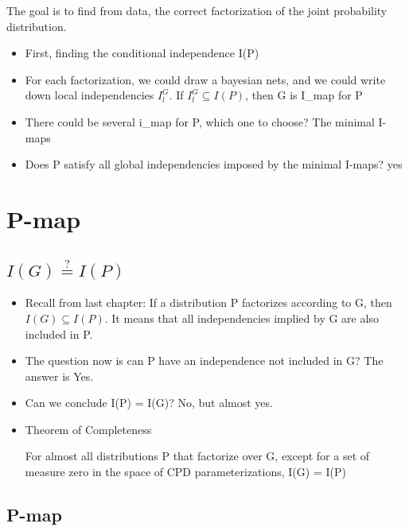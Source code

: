 \documentclass[11pt,a4paper]{report}
\begin{document}
The goal is to find from data, the correct factorization of the joint probability distribution. 

\begin{itemize}
    \item First, finding the conditional independence I(P)
    \item For each factorization, we could draw a bayesian nets, and we could write down local independencies $I_{l}^{G}$. If $I_{l}^{G} \subseteq I(P)$, then G is I\_map for P
    \item There could be several i\_map for P, which one to choose? The minimal I-maps
    \item Does P satisfy all global independencies imposed by the minimal I-maps? yes
\end{itemize}


\chapter{P-map}

\section{$I(G) \stackrel{?}{=} I(P)$}

\begin{itemize}
    \item Recall from last chapter: If a distribution P factorizes according to G, then $I(G) \subseteq I(P)$. It means that all independencies implied by G are also included in P.
    \item The question now is can P have an independence not included in G? The answer is Yes.
    \item Can we conclude I(P) = I(G)? No, but almost yes.
    \item Theorem of Completeness
    \begin{center}
        For almost all distributions P that factorize over G, except for a set of measure zero in the space of CPD parameterizations, I(G) = I(P)
    \end{center}
\end{itemize}

\section{P-map}
\end{document}
